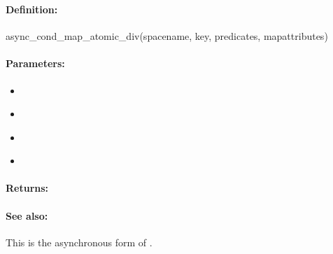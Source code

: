 \pagebreak
\subsubsection{}
\label{api:ruby:async_cond_map_atomic_div}


\paragraph{Definition:}
\begin{rubycode}
async_cond_map_atomic_div(spacename, key, predicates, mapattributes)
\end{rubycode}

\paragraph{Parameters:}
\begin{itemize}[noitemsep]
\item {}\\

\item {}\\

\item {}\\

\item {}\\

\end{itemize}

\paragraph{Returns:}


\paragraph{See also:}  This is the asynchronous form of .

\pagebreak
\subsubsection{}
\label{api:ruby:group_map_atomic_div}


